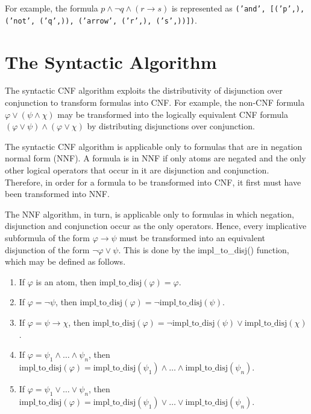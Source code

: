 \documentclass[a4paper,notitlepage]{scrartcl}
\let\phi\varphi
\begin{document}
\noindent
For example, the formula $p \land \lnot q \land (r \to s)$ is represented as
\texttt{('and', [('p',), ('not', ('q',)), ('arrow', ('r',), ('s',))])}.

\section{The Syntactic Algorithm}

The syntactic CNF algorithm exploits the distributivity of disjunction over
conjunction to transform formulas into CNF.
For example, the non-CNF formula $\phi \lor (\psi \land \chi)$ may be
transformed into the logically equivalent CNF formula $(\phi \lor \psi) \land
(\phi \lor \chi)$ by distributing disjunctions over conjunction.

The syntactic CNF algorithm is applicable only to formulas that are in negation
normal form (NNF).
A formula is in NNF if only atoms are negated and the only other logical
operators that occur in it are disjunction and conjunction.
Therefore, in order for a formula to be transformed into CNF, it first must
have been transformed into NNF.

The NNF algorithm, in turn, is applicable only to formulas in which negation,
disjunction and conjunction occur as the only operators.
Hence, every implicative subformula of the form $\phi \to \psi$ must be
transformed into an equivalent disjunction of the form $\lnot\phi \lor \psi$.
This is done by the impl\_to\_disj() function, which may be defined as follows.

\begin{enumerate}

\item
If $\phi$ is an atom, then $\mathrm{impl\_to\_disj}(\phi) = \phi$.

\item
If $\phi = \lnot\psi$, then $\mathrm{impl\_to\_disj}(\phi) =
\lnot\mathrm{impl\_to\_disj}(\psi)$.

\item
If $\phi = \psi \to \chi$, then $\mathrm{impl\_to\_disj}(\phi) =
\lnot\mathrm{impl\_to\_disj}(\psi) \lor \mathrm{impl\_to\_disj}(\chi)$.

\item
If $\phi = \psi_1 \land \ldots \land \psi_n$, then
$\mathrm{impl\_to\_disj}(\phi) = \mathrm{impl\_to\_disj}(\psi_1) \land \ldots
\land \mathrm{impl\_to\_disj}(\psi_n)$.

\item
If $\phi = \psi_1 \lor \ldots \lor \psi_n$, then
$\mathrm{impl\_to\_disj}(\phi) = \mathrm{impl\_to\_disj}(\psi_1) \lor \ldots
\lor \mathrm{impl\_to\_disj}(\psi_n)$.

\end{enumerate}
\end{document}
